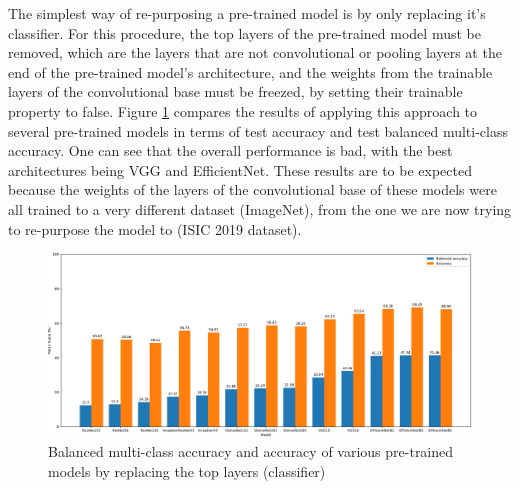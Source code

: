     The simplest way of re-purposing a pre-trained model is by only replacing it's classifier. For this procedure, the top layers of the pre-trained model must be removed, which are the layers that are not convolutional or pooling layers at the end of the pre-trained model's architecture, and the weights from the trainable layers of the convolutional base must be freezed, by setting their trainable property to false. Figure \ref{fig:pre_trained_models_classifier_comp} compares the results of applying this approach to several pre-trained models in terms of test accuracy and test balanced multi-class accuracy. One can see that the overall performance is bad, with the best architectures being VGG and EfficientNet. These results are to be expected because the weights of the layers of the convolutional base of these models were all trained to a very different dataset (ImageNet), from the one we are now trying to re-purpose the model to (ISIC 2019 dataset).  \par
    \begin{figure}[ht]
        \centering
        \includegraphics[scale=1.5, width=\textwidth]{figs/pre_trained_models_classifier_comp.pdf}
        \caption{Balanced multi-class accuracy and accuracy of various pre-trained models by replacing the top layers (classifier)}
        \label{fig:pre_trained_models_classifier_comp}
    \end{figure}
    
